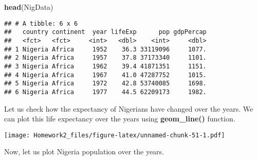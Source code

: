 \documentclass[]{article}
\newenvironment{Shaded}{\begin{snugshade}}{\end{snugshade}}
\newcommand{\KeywordTok}[1]{\textcolor[rgb]{0.13,0.29,0.53}{\textbf{{#1}}}}
\newcommand{\DataTypeTok}[1]{\textcolor[rgb]{0.13,0.29,0.53}{{#1}}}
\newcommand{\StringTok}[1]{\textcolor[rgb]{0.31,0.60,0.02}{{#1}}}
\newcommand{\CommentTok}[1]{\textcolor[rgb]{0.56,0.35,0.01}{\textit{{#1}}}}
\newcommand{\NormalTok}[1]{{#1}}
\begin{document}
\begin{Shaded}
\begin{Highlighting}[]
\KeywordTok{head}\NormalTok{(NigData)}
\end{Highlighting}
\end{Shaded}

\begin{verbatim}
## # A tibble: 6 x 6
##   country continent  year lifeExp      pop gdpPercap
##   <fct>   <fct>     <int>   <dbl>    <int>     <dbl>
## 1 Nigeria Africa     1952    36.3 33119096     1077.
## 2 Nigeria Africa     1957    37.8 37173340     1101.
## 3 Nigeria Africa     1962    39.4 41871351     1151.
## 4 Nigeria Africa     1967    41.0 47287752     1015.
## 5 Nigeria Africa     1972    42.8 53740085     1698.
## 6 Nigeria Africa     1977    44.5 62209173     1982.
\end{verbatim}

Let us check how the expectancy of Nigerians have changed over the
years. We can plot this life expectancy over the years using
\textbf{geom\_line()} function.

\begin{Shaded}
\end{Shaded}

\texttt{[image: Homework2\_files/figure-latex/unnamed-chunk-51-1.pdf]}

Now, let us plot Nigeria population over the years.

\begin{Shaded}
\end{Shaded}
\end{document}

